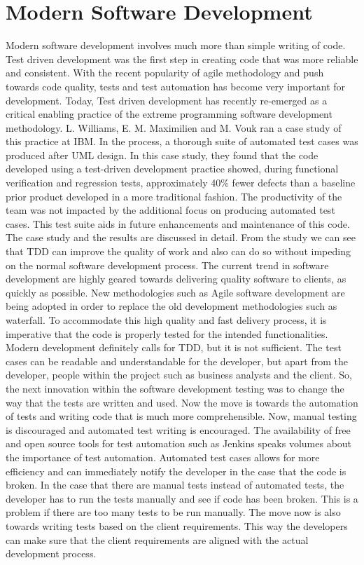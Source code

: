 \documentclass[conference]{IEEEtran}
\begin{document}
\section{Modern Software Development}
Modern software development involves much more than simple writing of code. Test driven development was the first step in creating code that was more reliable and consistent. With the recent popularity of agile methodology and push towards code quality, tests and test automation has become very important for development. Today, Test driven development has recently re-emerged as a critical enabling practice of the extreme programming software development methodology. L. Williams, E. M. Maximilien and M. Vouk ran a case study of this practice at IBM. In the process, a thorough suite of automated test cases was produced after UML design. In this case study, they found that the code developed using a test-driven development practice showed, during functional verification and regression tests, approximately 40\% fewer defects than a baseline prior product developed in a more traditional fashion. The productivity of the team was not impacted by the additional focus on producing automated test cases. This test suite aids in future enhancements and maintenance of this code. The case study and the results are discussed in detail.\cite{b4} From the study we can see that TDD can improve the quality of work and also can do so without impeding on the normal software development process. The current trend in software development are highly geared towards delivering quality software to clients, as quickly as possible. New methodologies such as Agile software development are being adopted in order to replace the old development methodologies such as waterfall. To accommodate this high quality and fast delivery process, it is imperative that the code is properly tested for the intended functionalities.\newline
Modern development definitely calls for TDD, but it is not sufficient. The test cases can be readable and understandable for the developer, but apart from the developer, people within the project such as business analysts and the client. So, the next innovation within the software development testing was to change the way that the tests are written and used.\newline
Now the move is towards the automation of tests and writing code that is much more comprehensible. Now, manual testing is discouraged and automated test writing is encouraged. The availability of free and open source tools for test automation such as Jenkins speaks volumes about the importance of test automation. Automated test cases allows for more efficiency and can immediately notify the developer in the case that the code is broken. In the case that there are manual tests instead of automated tests, the developer has to run the tests manually and see if code has been broken. This is a problem if there are too many tests to be run manually. The move now is also towards writing tests based on the client requirements. This way  the developers can make sure that the client requirements are aligned with the actual development process.\newline
\end{document}
